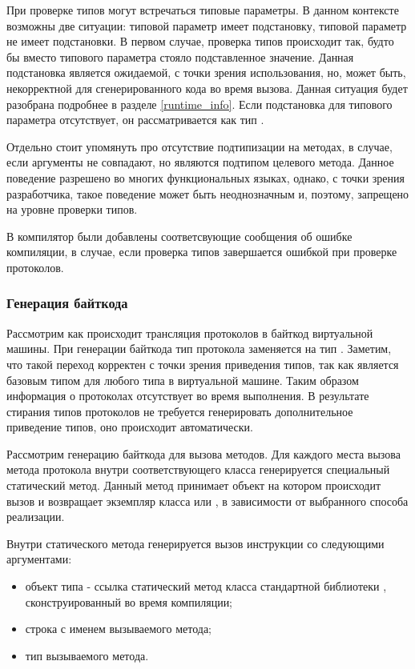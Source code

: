 При проверке типов могут встречаться типовые параметры. В данном контексте возможны две ситуации: типовой параметр имеет подстановку, типовой параметр не имеет подстановки. В первом случае, проверка типов происходит так, будто бы вместо типового параметра стояло подставленное значение. Данная подстановка является ожидаемой, с точки зрения использования, но, может быть, некорректной для сгенерированного кода во время вызова. Данная ситуация будет разобрана подробнее в разделе \ref{runtime_info}. Если подстановка для типового параметра отсутствует, он рассматривается как тип .

Отдельно стоит упомянуть про отсутствие подтипизации на методах, в случае, если аргументы не совпадают, но являются подтипом целевого метода. Данное поведение разрешено во многих функциональных языках, однако, с точки зрения разработчика, такое поведение может быть неоднозначным и, поэтому, запрещено на уровне проверки типов.

В компилятор были добавлены соответсвующие сообщения об ошибке компиляции, в случае, если проверка типов завершается ошибкой при проверке протоколов.

\subsubsection{Генерация байткода}
Рассмотрим как происходит трансляция протоколов в байткод виртуальной машины. При генерации байткода тип протокола заменяется на тип . Заметим, что такой переход корректен с точки зрения приведения типов, так как  является базовым типом для любого типа в виртуальной машине. Таким образом информация о протоколах отсутствует во время выполнения. В результате стирания типов протоколов не требуется генерировать дополнительное приведение типов, оно происходит автоматически.

Рассмотрим генерацию байткода для вызова методов. Для каждого места вызова метода протокола внутри соответствующего класса генерируется специальный статический метод. Данный метод принимает объект на котором происходит вызов и возвращает экземпляр класса  или , в зависимости от выбранного способа реализации.

Внутри статического метода генерируется вызов инструкции  со следующими аргументами:
\begin{itemize}
  \item объект типа  - ссылка статический метод  класса стандартной библиотеки , сконструированный во время компиляции;
  \item строка с именем вызываемого метода;
  \item тип вызываемого метода.
\end{itemize}

